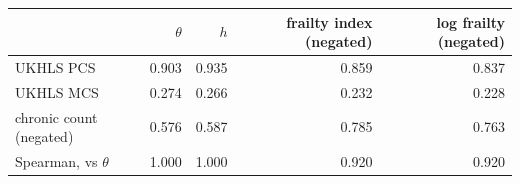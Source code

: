 \begin{tabular}{lrrrr}
\toprule
 & $\theta$ & $h$ & frailty index (negated) & log frailty (negated) \\
\midrule
UKHLS PCS & 0.903 & 0.935 & 0.859 & 0.837 \\
UKHLS MCS & 0.274 & 0.266 & 0.232 & 0.228 \\
chronic count (negated) & 0.576 & 0.587 & 0.785 & 0.763 \\
Spearman, vs $\theta$ & 1.000 & 1.000 & 0.920 & 0.920 \\
\bottomrule
\end{tabular}

